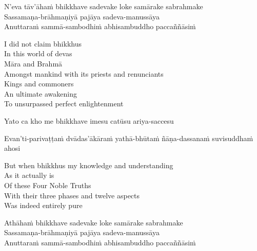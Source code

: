 N'eva tāv'āhaṁ bhikkhave sadevake loke samārake sabrahmake\\
Sassamaṇa-brāhmaṇiyā pajāya sadeva-manussāya\\
Anuttaraṁ sammā-sambodhiṁ abhisambuddho\makeatletter\hyperlink{endnote58-appendix}\makeatother
paccaññāsiṁ

\begin{english-verses}
  I did not claim bhikkhus\\
  In this world of devas\\
  Māra and Brahmā\\
  Amongst mankind with its priests and renunciants\\
  Kings and commoners\\
  An ultimate awakening\\
  To unsurpassed perfect enlightenment
\end{english-verses}

Yato ca kho me bhikkhave imesu catūsu ariya-saccesu\\
\begin{pali-hang}
  Evan'ti-parivaṭṭaṁ dvādas'ākāraṁ yathā-bhūtaṁ ñāṇa-dassanaṁ suvisuddhaṁ ahosi
\end{pali-hang}

\begin{english-verses}
  But when bhikkhus my knowledge and understanding\\
  As it actually is\\
  Of these Four Noble Truths\\
  With their three phases and twelve aspects\\
  Was indeed entirely pure
\end{english-verses}

Athāhaṁ bhikkhave sadevake loke samārake sabrahmake\\
Sassamaṇa-brāhmaṇiyā pajāya sadeva-manussāya\\
Anuttaraṁ sammā-sambodhiṁ abhisambuddho paccaññāsiṁ

